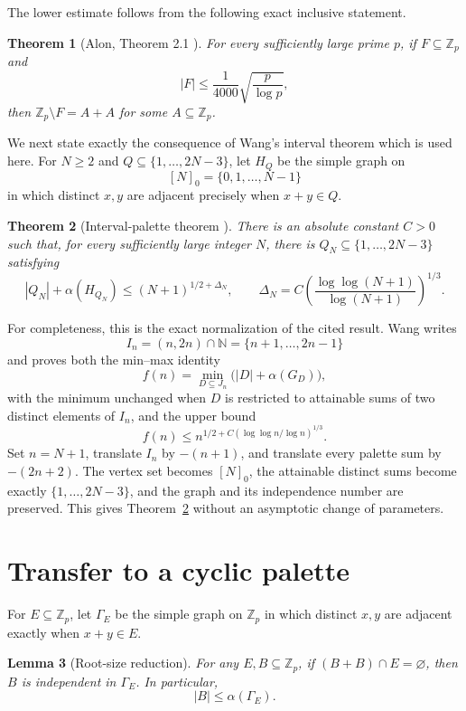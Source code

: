 \documentclass[11pt]{article}
\newtheorem{theorem}{Theorem}
\newtheorem{lemma}[theorem]{Lemma}
\theoremstyle{definition}
\newcommand{\Zp}{\mathbb Z_p}
\newcommand{\alphaG}{\alpha}
\begin{document}
The lower estimate follows from the following exact inclusive statement.

\begin{theorem}[Alon, Theorem 2.1 \cite{Alon2007}]\label{thm:alon}
For every sufficiently large prime $p$, if $F\subseteq\Zp$ and
\[
  |F|\le \frac{1}{4000}\sqrt{\frac p{\log p}},
\]
then $\Zp\setminus F=A+A$ for some $A\subseteq\Zp$.
\end{theorem}

We next state exactly the consequence of Wang's interval theorem which is
used here.  For $N\ge2$ and
$Q\subseteq\{1,\ldots,2N-3\}$, let $H_Q$ be the simple graph on
\[
  [N]_0=\{0,1,\ldots,N-1\}
\]
in which distinct $x,y$ are adjacent precisely when $x+y\in Q$.

\begin{theorem}[Interval-palette theorem \cite{Wang2026}]\label{thm:interval}
There is an absolute constant $C>0$ such that, for every sufficiently large
integer $N$, there is $Q_N\subseteq\{1,\ldots,2N-3\}$ satisfying
\[
  |Q_N|+\alphaG(H_{Q_N})
  \le (N+1)^{1/2+\Delta_N},
  \qquad
  \Delta_N=C\left(\frac{\log\log(N+1)}{\log(N+1)}\right)^{1/3}.
\]
\end{theorem}

For completeness, this is the exact normalization of the cited result.
Wang writes
\[
  I_n=(n,2n)\cap\mathbb N=\{n+1,\ldots,2n-1\}
\]
and proves both the min--max identity
\[
  f(n)=\min_{D\subseteq J_n}\bigl(|D|+\alpha(G_D)\bigr),
\]
with the minimum unchanged when $D$ is restricted to attainable sums of two
distinct elements of $I_n$, and the upper bound
\[
  f(n)\le n^{1/2+C(\log\log n/\log n)^{1/3}}.
\]
Set $n=N+1$, translate $I_n$ by $-(n+1)$, and translate every palette sum by
$-(2n+2)$.  The vertex set becomes $[N]_0$, the attainable distinct sums
become exactly $\{1,\ldots,2N-3\}$, and the graph and its independence number
are preserved.  This gives Theorem~\ref{thm:interval} without an asymptotic
change of parameters.

\section{Transfer to a cyclic palette}

For $E\subseteq\Zp$, let $\Gamma_E$ be the simple graph on $\Zp$ in which
distinct $x,y$ are adjacent exactly when $x+y\in E$.

\begin{lemma}[Root-size reduction]\label{lem:root-bound}
For any $E,B\subseteq\Zp$, if $(B+B)\cap E=\varnothing$, then $B$ is
independent in $\Gamma_E$.  In particular,
\[
  |B|\le\alphaG(\Gamma_E).
\]
\end{lemma}
\end{document}
